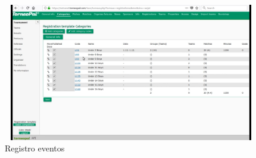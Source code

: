 \begin{figure}[h!]
	\centering
	\includegraphics[width=12cm, height=6cm]{Imagenes/Aplicaciones/TP2.png}
	\caption{Registro eventos}
\end{figure}
\pagebreak

